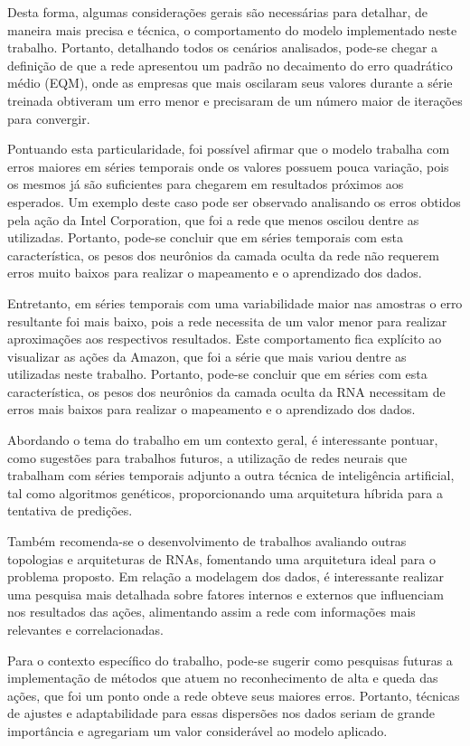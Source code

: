 Desta forma, algumas considerações gerais são necessárias para detalhar, de maneira mais precisa e técnica, o comportamento do modelo implementado neste trabalho. Portanto, detalhando todos os cenários analisados, pode-se chegar a definição de que a rede apresentou um padrão no decaimento do erro quadrático médio (EQM), onde as empresas que mais oscilaram seus valores durante a série treinada obtiveram um erro menor e precisaram de um número maior de iterações para convergir. 

Pontuando esta particularidade, foi possível afirmar que o modelo trabalha com erros maiores em séries temporais onde os valores possuem pouca variação, pois os mesmos já são suficientes para chegarem em resultados próximos aos esperados. Um exemplo deste caso pode ser observado analisando os erros obtidos pela ação da Intel Corporation, que foi a rede que menos oscilou dentre as utilizadas. Portanto, pode-se concluir que em séries temporais com esta característica, os pesos dos neurônios da camada oculta da rede não requerem erros muito baixos para realizar o mapeamento e o aprendizado dos dados. 

Entretanto, em séries temporais com uma variabilidade maior nas amostras o erro resultante foi mais baixo, pois a rede necessita de um valor menor para realizar aproximações aos respectivos resultados. Este comportamento fica explícito ao visualizar as ações da Amazon, que foi a série que mais variou dentre as utilizadas neste trabalho. Portanto, pode-se concluir que em séries com esta característica, os pesos dos neurônios da camada oculta da RNA necessitam de erros mais baixos para realizar o mapeamento e o aprendizado dos dados.

Abordando o tema do trabalho em um contexto geral, é interessante pontuar, como sugestões para trabalhos futuros, a utilização de redes neurais que trabalham com séries temporais adjunto a outra técnica de inteligência artificial, tal como algoritmos genéticos, proporcionando uma arquitetura híbrida para a tentativa de predições. 

Também recomenda-se o desenvolvimento de trabalhos avaliando outras topologias e arquiteturas de RNAs, fomentando uma arquitetura ideal para o problema proposto. Em relação a modelagem dos dados, é interessante realizar uma pesquisa mais detalhada sobre fatores internos e externos que influenciam nos resultados das ações, alimentando assim a rede com informações mais relevantes e correlacionadas.

Para o contexto específico do trabalho, pode-se sugerir como pesquisas futuras a implementação de métodos que atuem no reconhecimento de alta e queda das ações, que foi um ponto onde a rede obteve seus maiores erros. Portanto, técnicas de ajustes e adaptabilidade para essas dispersões nos dados seriam de grande importância e agregariam um valor considerável ao modelo aplicado.